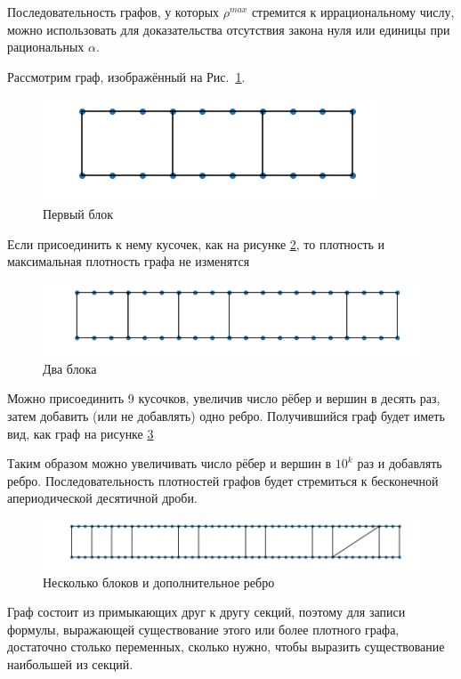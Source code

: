 Последовательность графов, у которых $\rho^{max}$ стремится к иррациональному числу, можно использовать для доказательства отсутствия закона нуля или единицы при рациональных $\alpha$.

Рассмотрим граф, изображённый на Рис.~\ref{fig:first block}.
\begin{figure}[h]
  \centering
  \includegraphics[scale=0.5]{picrel/first_block.png}
  \caption{Первый блок}
  \label{fig:first block}
\end{figure}

Если присоединить к нему кусочек, как на рисунке \ref{fig:2 blocks}, то плотность и максимальная плотность графа не изменятся

\begin{figure}[h]
  \centering
  \includegraphics[scale=0.5]{picrel/2_blocks.png}
  \caption{Два блока}
  \label{fig:2 blocks}
\end{figure}

Можно присоединить 9 кусочков, увеличив число рёбер и 
вершин в десять раз, затем добавить (или не добавлять) одно ребро. Получившийся граф будет иметь вид, как граф на рисунке \ref{fig:additional edge}

Таким образом можно увеличивать число рёбер и вершин в $10^k$ раз и добавлять ребро.
Последовательность плотностей графов будет стремиться к бесконечной апериодической десятичной дроби.

\begin{figure}[ht]
  \includegraphics[scale=0.5]{picrel/additional_edge.png}
  \caption{Несколько блоков и дополнительное ребро}
  \label{fig:additional edge}
\end{figure}

Граф состоит из примыкающих друг к другу секций, поэтому для записи формулы, выражающей существование этого или более плотного графа, достаточно столько переменных, сколько нужно, чтобы выразить существование наибольшей из секций. 